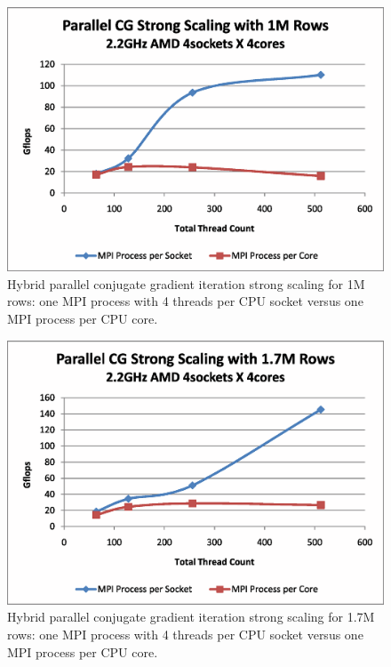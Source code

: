 \begin{figure}[h]
\center
\includegraphics[viewport=1in 0.5in 8.5in 6.5in,angle=0,scale=0.5]{StrongScaling1000k.eps}
\caption{Hybrid parallel conjugate gradient iteration strong scaling for 1M rows: one MPI process with 4 threads per CPU socket versus one MPI process per CPU core.}
\label{fig:CGPerf:scaling1M}
\end{figure}

\begin{figure}[h]
\center
\includegraphics[viewport=1in 0.5in 8.5in 6.5in,angle=0,scale=0.5]{StrongScaling1700k.eps}
\caption{Hybrid parallel conjugate gradient iteration strong scaling for 1.7M rows: one MPI process with 4 threads per CPU socket versus one MPI process per CPU core.}
\label{fig:CGPerf:scaling1.7M}
\end{figure}


